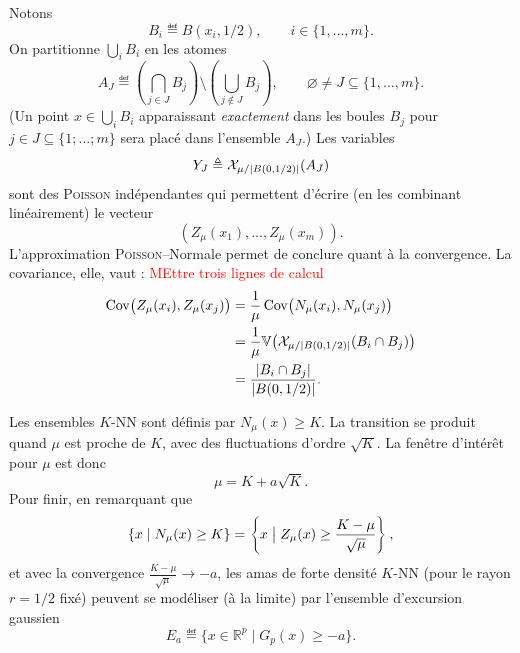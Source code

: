 \begin{Preuve}
Notons
\[
    B_i \eqdef B(x_i,1/2),
    \qquad i\in\{1,\ldots,m\}.
\]
On partitionne $\bigcup_i B_i$ en les atomes
\[
    A_J
    \eqdef
    \left(\bigcap_{j\in J}B_j\right)
    \setminus
    \left(\bigcup_{j\notin J}B_j\right),
    \qquad
    \varnothing\neq J\subseteq\{1,\ldots,m\}.
\]
(Un point $x \in \bigcup_i B_i$ apparaissant \emph{exactement} dans les boules $B_j$ pour $j \in J \subseteq\bigl\{ 1 ; \ldots ; m\bigr\}$ sera placé dans l'ensemble $A_J$.)
Les variables
\[
    Y_J\triangleq \mathcal X_{\mu/\lvert B(0,1/2) \rvert}(A_J)
\]
sont des \textsc{Poisson} indépendantes qui permettent d'écrire (en les combinant linéairement) le vecteur %
\[
    \left(Z_\mu(x_1),\ldots,Z_\mu(x_m)\right).
\]
L'approximation \textsc{Poisson}--Normale permet de conclure quant à la convergence. La covariance, elle, vaut :
\textcolor{red}{MEttre trois lignes de calcul}
\[
\begin{split}
    \operatorname{Cov}\bigl(Z_\mu(x_i),Z_\mu(x_j)\bigr)
    &=
    \frac1\mu
    \operatorname{Cov}\bigl(N_\mu(x_i),N_\mu(x_j)\bigr)\\
    &=
    \frac1\mu
    \mathbb V \bigl(\mathcal X_{\mu/\lvert B(0,1/2) \rvert}(B_i\cap B_j)\bigr)\\
    &=
    \frac{|B_i\cap B_j|}{\lvert B(0,1/2) \rvert}.
\end{split}
\]
\end{Preuve}

Les ensembles $K$-NN sont définis par $N_\mu(x) \ge K$. La transition se produit quand $\mu$ est proche de $K$, avec des fluctuations d'ordre $\sqrt K$. La fenêtre d'intérêt pour $\mu$ est donc
\[
    \mu = K+a\sqrt K.
\]
Pour finir, en remarquant que 
\[
    \{x \mid N_\mu(x)\ge K\}
    =
    \left\{
        x \bigm| Z_\mu(x)\ge \frac{K-\mu}{\sqrt\mu}
    \right\},
\]
et avec la convergence $ \frac{K-\mu}{\sqrt\mu} \to -a$, les amas de forte densité $K$-NN (pour le rayon $r=1/2$ fixé) peuvent se modéliser (à la limite) par l'ensemble d'excursion gaussien \cite{AzaisWschebor2009, AdlerTaylor2007}
\[
    E_a
    \eqdef
    \{x\in\mathbb R^p \mid G_p(x)\ge -a\}.
\]

